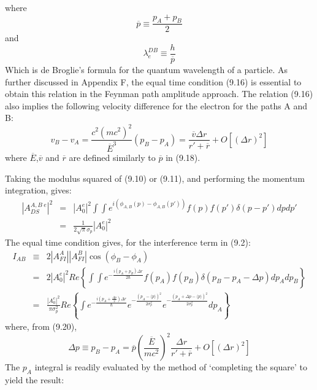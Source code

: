 \documentclass [12pt]{article}
\begin{document}
{\begin{equation}
   \end{equation}
   where 
    \begin{equation}
    \overline{p} \equiv \frac{p_A+p_B}{2}
   \end{equation}  
     and
    \begin{equation} 
     \lambda_e^{DB} \equiv  \frac{h}{\overline{p}}
   \end{equation}
   Which is de Broglie's formula for the quantum wavelength of a particle. As further discussed 
  in Appendix F, the equal time condition (9.16) is essential to obtain this relation
  in the Feynman path amplitude approach. The relation (9.16) also implies the following
  velocity difference for the electron for the paths A and B:
   \begin{equation} 
 v_B -v_A = \frac{c^2(mc^2)^2}{\overline{E}^3}(p_B-p_A)  = \frac{\overline{v} \Delta r}{r'+\overline{r}}
  +O[(\Delta r)^2]
   \end{equation}
 where $\overline{E}$,$\overline{v}$ and $\overline{r}$ are defined similarly to $\overline{p}$ in (9.18).
 \par Taking the modulus squared of (9.10) or (9.11), and performing the momentum integration, gives:
  \begin{eqnarray}
 |A_{DS}^{A,B~e}|^2 & = & |A_0^e|^2 \int \int e^{i(\phi_{A,B}(p)-\phi_{A,B}(p'))}f(p)f(p')\delta(p-p') dp dp'
  \nonumber \\
   & = &  \frac{1}{2 \sqrt{\pi} \sigma_p}|A_0^e|^2
  \end{eqnarray}
   The equal time condition gives, for the interference term in (9.2):
  \begin{eqnarray}
  I_{AB} & \equiv & 2 |A_{FI}^A||A_{FI}^B|\cos(\phi_B-\phi_A)\nonumber \\
  & = & 2 |A_0^e|^2 Re \left\{ \int \int e^{-\frac{i(p_A+p_B)\Delta r}{2 \hbar}}f(p_A)f(p_B)\delta(p_B-p_A-\Delta p)
   dp_A dp_B \right\}\nonumber \\
    & = &  \frac{|A_0^e|^2}{\pi \sigma_p^2} Re  \left\{ \int   e^{-\frac{i(p_A+\frac{\Delta p}{2})\Delta r}{\hbar}}  
    e^{-\frac{(p_A-\langle p \rangle)^2}{2\sigma_p^2}}  e^{-\frac{(p_A+ \Delta p-\langle p \rangle)^2}{2\sigma_p^2}}
     dp_A  \right\}
  \end{eqnarray}
 where, from (9.20),
    \begin{equation}
   \Delta p \equiv p_B-p_A = \overline{p} \left(\frac{\overline{E}}{mc^2}\right)^2\frac{\Delta r}{r'+\overline{r}}
    +O[(\Delta r)^2]
   \end{equation}
 The $p_A$ integral is readily evaluated by the method of `completing the square' to yield the result:
}
\end{document}
